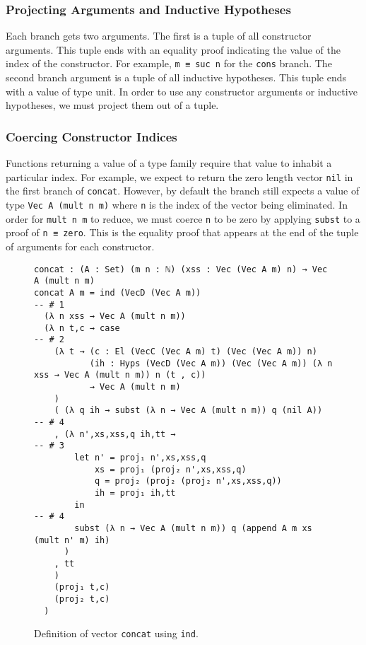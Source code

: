 \documentclass[preprint,nonatbib]{sigplanconf}
\begin{document}
\subsubsection{Projecting Arguments and Inductive Hypotheses}
Each branch gets two arguments. The first is a tuple of all
constructor arguments. This tuple ends with an equality proof
indicating the value of the index of the constructor. For example,
{\tt m ≡ suc n} for the {\tt cons} branch. The second branch argument
is a tuple of all inductive hypotheses. This tuple ends with a value
of type unit. In order to use any constructor arguments or inductive
hypotheses, we must project them out of a tuple.

\subsubsection{Coercing Constructor Indices}
Functions returning a value of a type family require that value to
inhabit a particular index. For example, we expect to return the zero
length vector {\tt nil} in the first branch of {\tt concat}.
However, by default the branch still expects a value of type
{\tt Vec A (mult n m)} where {\tt n} is the index of the vector being
eliminated. In order for {\tt mult n m} to reduce, we must coerce {\tt n}
to be zero by applying {\tt subst} to a proof of {\tt n ≡ zero}. This
is the equality proof that appears at the end of the tuple of
arguments for each constructor.


\begin{figure*}
\caption{Definition of vector {\tt concat} using {\tt ind}.}
\label{fig:ind:concat}

\begin{verbatim}
concat : (A : Set) (m n : ℕ) (xss : Vec (Vec A m) n) → Vec A (mult n m)
concat A m = ind (VecD (Vec A m))                              -- # 1
  (λ n xss → Vec A (mult n m))
  (λ n t,c → case                                              -- # 2
    (λ t → (c : El (VecC (Vec A m) t) (Vec (Vec A m)) n)
           (ih : Hyps (VecD (Vec A m)) (Vec (Vec A m)) (λ n xss → Vec A (mult n m)) n (t , c))
           → Vec A (mult n m)
    )
    ( (λ q ih → subst (λ n → Vec A (mult n m)) q (nil A))     -- # 4
    , (λ n',xs,xss,q ih,tt →                                  -- # 3
        let n' = proj₁ n',xs,xss,q
            xs = proj₁ (proj₂ n',xs,xss,q)
            q = proj₂ (proj₂ (proj₂ n',xs,xss,q))
            ih = proj₁ ih,tt
        in                                                     -- # 4
        subst (λ n → Vec A (mult n m)) q (append A m xs (mult n' m) ih)
      )
    , tt
    )
    (proj₁ t,c)
    (proj₂ t,c)
  )
\end{verbatim}

\end{figure*}
\end{document}
